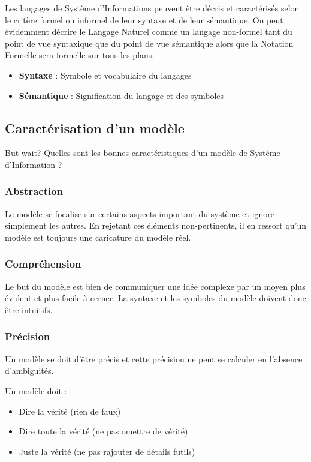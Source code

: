 \documentclass[../Syllabus.tex]{subfiles}
\begin{document}
Les langages de Système d'Informations peuvent être décris et caractérisés selon le critère formel ou informel de leur syntaxe et de leur sémantique. On peut évidemment décrire le Langage Naturel comme un langage non-formel tant du point de vue syntaxique que du point de vue sémantique alors que la Notation Formelle sera formelle sur tous les plans.

\begin{itemize}
  \item \textbf{Syntaxe} : Symbole et vocabulaire du langages
  \item \textbf{Sémantique} : Signification du langage et des symboles
\end{itemize}

\subsection{Caractérisation d'un modèle}

But wait? Quelles sont les bonnes caractéristiques d'un modèle de Système d'Information ?

\subsubsection{Abstraction}

Le modèle se focalise sur certains aspects important du système et ignore simplement les autres. En rejetant ces éléments non-pertinents, il en ressort qu'un modèle est toujours une caricature du modèle réel.

\subsubsection{Compréhension}

Le but du modèle est bien de communiquer une idée complexe par un moyen plus évident et plus facile à cerner. La syntaxe et les symboles du modèle doivent donc être intuitifs.

\subsubsection{Précision}

Un modèle se doit d'être précis et cette précision ne peut se calculer en l'absence d'ambiguités.

Un modèle doit :

\begin{itemize}
  \item Dire la vérité (rien de faux)
  \item Dire toute la vérité (ne pas omettre de vérité)
  \item Juste la vérité (ne pas rajouter de détails futils)
\end{itemize}
\end{document}
